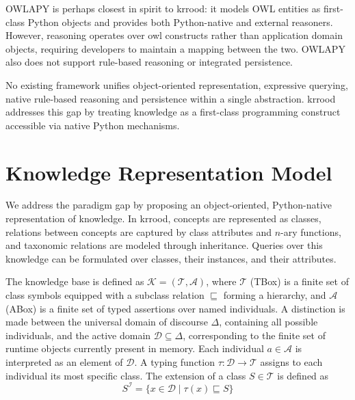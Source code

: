 \documentclass[a4paper,fleqn]{cas-sc}
\begin{document}
OWLAPY \citep{baci2025owlapy} is perhaps closest in spirit to \ac{krrood}: it models OWL entities as first-class Python objects and provides both Python-native and external reasoners. However, reasoning operates over \ac{owl} constructs rather than application domain objects, requiring developers to maintain a mapping between the two. OWLAPY also does not support rule-based reasoning or integrated persistence.

No existing framework unifies object-oriented representation, expressive querying, native rule-based reasoning and persistence within a single abstraction. \Ac{krrood} addresses this gap by treating knowledge as a first-class programming construct accessible via native Python mechanisms.

\section{Knowledge Representation Model}
\label{sec:eql_kb}

We address the paradigm gap by proposing an object-oriented, Python-native
representation of knowledge. In \ac{krrood}, concepts are represented as
classes, relations between concepts are captured by class attributes and
$n$-ary functions, and taxonomic relations are modeled through inheritance.
Queries over this knowledge can be formulated over classes, their instances,
and their attributes.




The knowledge base is defined as $\mathcal{K} = (\mathcal{T}, \mathcal{A})$, where $\mathcal{T}$ (TBox) is a finite set of class symbols equipped with a subclass relation $\sqsubseteq$ forming a hierarchy, and $\mathcal{A}$ (ABox) is a finite set of typed assertions over named individuals.
\noindent
A distinction is made between the universal domain of discourse $\Delta$, containing all possible individuals, and the active domain $\mathcal{D} \subseteq \Delta$, corresponding to the finite set of runtime objects currently present in memory. Each individual $a \in \mathcal{A}$ is interpreted as an element of $\mathcal{D}$.
\noindent
A typing function $\tau : \mathcal{D} \rightarrow \mathcal{T}$ assigns to each individual its most specific class. The extension of a class $S \in \mathcal{T}$ is defined as
\[
S^{\mathcal{I}} = \{ x \in \mathcal{D} \mid \tau(x) \sqsubseteq S \}
\]
\end{document}
